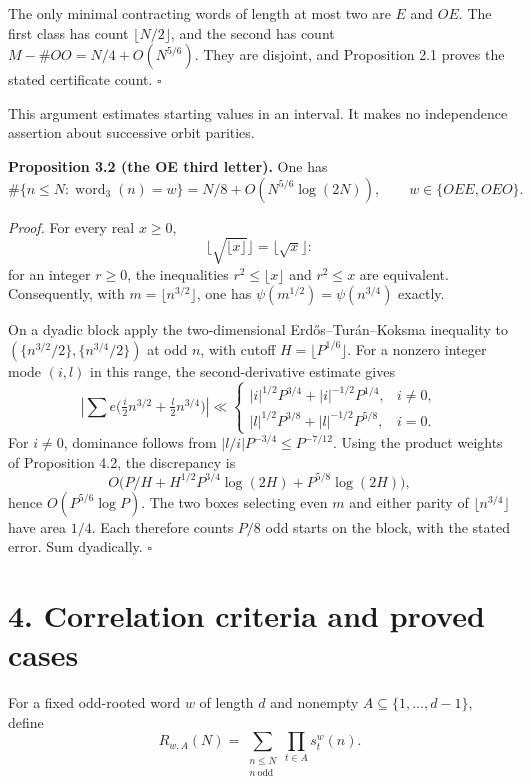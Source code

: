 \documentclass[11pt,a4paper]{article}
\begin{document}
The only minimal contracting words of length at most two are \(E\) and
\(OE\). The first class has count \(\lfloor N/2\rfloor\), and the second
has count \(M-\#OO=N/4+O(N^{5/6})\). They are disjoint, and Proposition
2.1 proves the stated certificate count. \(\square\)

This argument estimates starting values in an interval. It makes no
independence assertion about successive orbit parities.


\textbf{Proposition 3.2 (the OE third letter).} One has \[
\#\{n\le N:\operatorname{word}_3(n)=w\}
=N/8+O(N^{5/6}\log(2N)),
\qquad w\in\{OEE,OEO\}.
\]

\emph{Proof.} For every real \(x\ge0\), \[
\lfloor\sqrt{\lfloor x\rfloor}\rfloor=\lfloor\sqrt x\rfloor:
\] for an integer \(r\ge0\), the inequalities \(r^2\le\lfloor x\rfloor\)
and \(r^2\le x\) are equivalent. Consequently, with
\(m=\lfloor n^{3/2}\rfloor\), one has \(\psi(m^{1/2})=\psi(n^{3/4})\)
exactly.

On a dyadic block apply the two-dimensional Erd\H{o}s--Tur\'{a}n--Koksma
inequality to \((\{n^{3/2}/2\},\{n^{3/4}/2\})\) at odd \(n\), with
cutoff \(H=\lfloor P^{1/6}\rfloor\). For a nonzero integer mode
\((i,l)\) in this range, the second-derivative estimate gives \[
\left|\sum e\bigl(\tfrac i2n^{3/2}+\tfrac l2n^{3/4}\bigr)\right|
\ll
\begin{cases}
|i|^{1/2}P^{3/4}+|i|^{-1/2}P^{1/4},&i\ne0,\\
|l|^{1/2}P^{3/8}+|l|^{-1/2}P^{5/8},&i=0.
\end{cases}
\] For \(i\ne0\), dominance follows from \(|l/i|P^{-3/4}\le P^{-7/12}\).
Using the product weights of Proposition 4.2, the discrepancy is \[
O\bigl(P/H+H^{1/2}P^{3/4}\log(2H)+P^{5/8}\log(2H)\bigr),
\] hence \(O(P^{5/6}\log P)\). The two boxes selecting even \(m\) and
either parity of \(\lfloor n^{3/4}\rfloor\) have area \(1/4\). Each
therefore counts \(P/8\) odd starts on the block, with the stated error.
Sum dyadically. \(\square\)

\section{4. Correlation criteria and proved
cases}\label{correlation-criteria-and-proved-cases}

For a fixed odd-rooted word \(w\) of length \(d\) and nonempty
\(A\subseteq\{1,\ldots,d-1\}\), define \[
R_{w,A}(N)=\sum_{\substack{n\le N\\n\ \mathrm{odd}}}
\prod_{t\in A}s_t^w(n).
\]
\end{document}
